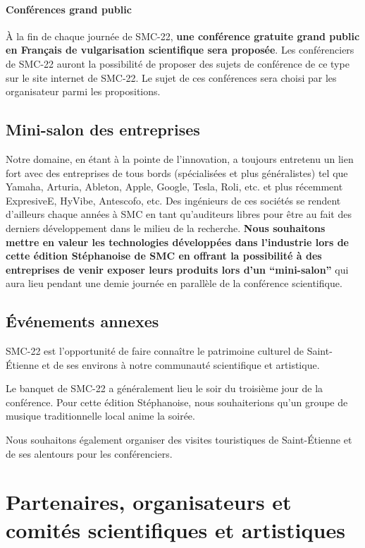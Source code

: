 \documentclass[fontsize=12pt]{scrartcl} %
\numberwithin{equation}{section} %
\numberwithin{table}{section} %
\begin{document}
\paragraph{\textbf{Conférences grand public}} À la fin de chaque journée de SMC-22, \textbf{une conférence gratuite grand public en Français de vulgarisation scientifique sera proposée}. Les conférenciers de SMC-22 auront la possibilité de proposer des sujets de conférence de ce type sur le site internet de SMC-22. Le sujet de ces conférences sera choisi par les organisateur parmi les propositions.

\subsection{Mini-salon des entreprises}

Notre domaine, en étant à la pointe de l'innovation, a toujours entretenu un lien fort avec des entreprises de tous bords (spécialisées et plus généralistes) tel que Yamaha, Arturia, Ableton, Apple, Google, Tesla, Roli, etc. et plus récemment ExpresiveE, HyVibe, Antescofo, etc. Des ingénieurs de ces sociétés se rendent d'ailleurs chaque années à SMC en tant qu'auditeurs libres pour être au fait des derniers développement dans le milieu de la recherche. \textbf{Nous souhaitons mettre en valeur les technologies développées dans l'industrie lors de cette édition Stéphanoise de SMC en offrant la possibilité à des entreprises de venir exposer leurs produits lors d'un ``mini-salon''} qui aura lieu pendant une demie journée en parallèle de la conférence scientifique.   

\subsection{Événements annexes}

SMC-22 est l'opportunité de faire connaître le patrimoine culturel de Saint-Étienne et de ses environs à notre communauté scientifique et artistique. 

Le banquet de SMC-22 a généralement lieu le soir du troisième jour de la conférence. Pour cette édition Stéphanoise, nous souhaiterions qu'un groupe de musique traditionnelle local anime la soirée.

Nous souhaitons également organiser des visites touristiques de Saint-Étienne et de ses alentours pour les conférenciers.

\section{Partenaires, organisateurs et comités scientifiques et artistiques}
\label{sec:part}
\end{document}
